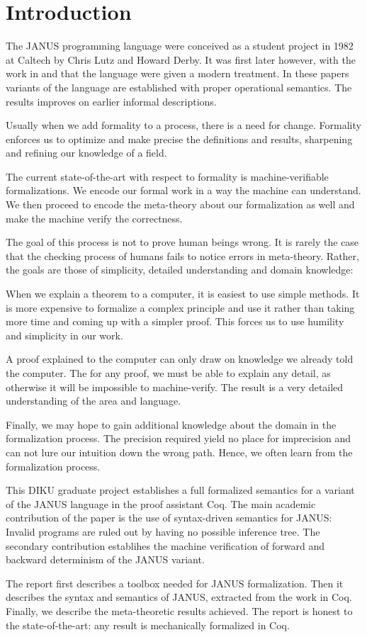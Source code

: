 \chapter{Introduction}

The JANUS programming language were conceived as a student project in
1982 at Caltech by Chris Lutz and Howard Derby. It was first later
however, with the work in \cite{glueck2007} and \cite{glueck2008} that
the language were given a modern treatment. In these papers variants
of the language are established with proper operational semantics. The
results improves on earlier informal descriptions.

Usually when we add formality to a process, there is a need for
change. Formality enforces us to optimize and make precise the
definitions and results, sharpening and refining our knowledge of a
field.

The current state-of-the-art with respect to formality is
machine-verifiable formalizations. We encode our formal work in a way
the machine can understand. We then proceed to encode the meta-theory
about our formalization as well and make the machine verify the
correctness.

The goal of this process is not to prove human beings wrong. It is
rarely the case that the checking process of humans fails to notice
errors in meta-theory. Rather, the goals are those of simplicity,
detailed understanding and domain knowledge:

When we explain a theorem to a computer, it is easiest to use simple
methods. It is more expensive to formalize a complex principle and use
it rather than taking more time and coming up with a simpler
proof. This forces us to use humility and simplicity in our work.

A proof explained to the computer can only draw on knowledge we
already told the computer. The for any proof, we must be able to
explain any detail, as otherwise it will be impossible to
machine-verify. The result is a very detailed understanding of the
area and language.

Finally, we may hope to gain additional knowledge about the domain in
the formalization process. The precision required yield no place for
imprecision and can not lure our intuition down the wrong path. Hence,
we often learn from the formalization process.

This DIKU graduate project establishes a full formalized semantics for
a variant of the JANUS language in the proof assistant Coq. The
main academic contribution of the paper is the use of syntax-driven
semantics for JANUS: Invalid programs are ruled out by having no possible
inference tree. The secondary contribution establihes the machine
verification of forward and backward determinism of the JANUS variant.

The report first describes a toolbox needed for JANUS
formalization. Then it describes the syntax and semantics of JANUS,
extracted from the work in Coq. Finally, we describe the
meta-theoretic results achieved. The report is honest to the
state-of-the-art: any result is mechanically formalized in Coq.


